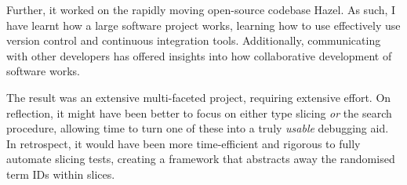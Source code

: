 Further, it worked on the rapidly moving open-source codebase Hazel. As such, I have learnt how a large software project works, learning how to use effectively use version control and continuous integration tools. Additionally, communicating with other developers has offered insights into how collaborative development of software works.

The result was an extensive multi-faceted project, requiring extensive effort. On reflection, it might have been better to focus on either type slicing \textit{or} the search procedure, allowing time to turn one of these into a truly \textit{usable} debugging aid. In retrospect, it would have been more time-efficient and rigorous to fully automate slicing tests, creating a framework that abstracts away the randomised term IDs within slices.